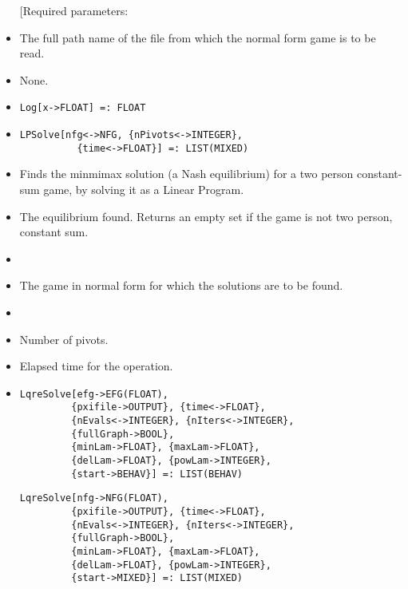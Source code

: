 \begin{itemize}
[Required parameters:

\bd
\item
[file:] The full path name of the file from which the normal form game
is to be read. \ed

\item
[Optional parameters:] None.\hfil\null
\ed

\item
\protect \large \begin{verbatim}
Log[x->FLOAT] =: FLOAT
\end{verbatim} \normalsize

\item
\protect \large \begin{verbatim}
LPSolve[nfg<->NFG, {nPivots<->INTEGER},
          {time<->FLOAT}] =: LIST(MIXED)
\end{verbatim}\normalsize

\bd
\item
[Description:] Finds the minmimax solution (a Nash equilibrium) for a
two person constant-sum game, by solving it as a Linear Program.
\item
[Return value:] The equilibrium found.  Returns an empty set if the
game is not two person, constant sum. 
\item
[Required parameters:]
\bd
\item
[nfg:] The game in normal form for which the solutions are to be found.  
\ed

\item
[Optional parameters:]\hfil\null

\bd
\item[nPivots:] Number of pivots. 
\item[time:] Elapsed time for the operation.
\ed
\ed

\item
\protect \large \begin{verbatim}
LqreSolve[efg->EFG(FLOAT),
         {pxifile->OUTPUT}, {time<->FLOAT},
         {nEvals<->INTEGER}, {nIters<->INTEGER},
         {fullGraph->BOOL},
         {minLam->FLOAT}, {maxLam->FLOAT}, 
         {delLam->FLOAT}, {powLam->INTEGER}, 
         {start->BEHAV}] =: LIST(BEHAV)
\end{verbatim}\normalsize

\protect \large \begin{verbatim}
LqreSolve[nfg->NFG(FLOAT),
         {pxifile->OUTPUT}, {time<->FLOAT},
         {nEvals<->INTEGER}, {nIters<->INTEGER},
         {fullGraph->BOOL},
         {minLam->FLOAT}, {maxLam->FLOAT}, 
         {delLam->FLOAT}, {powLam->INTEGER}, 
         {start->MIXED}] =: LIST(MIXED)
\end{verbatim}\normalsize


\end{itemize}
